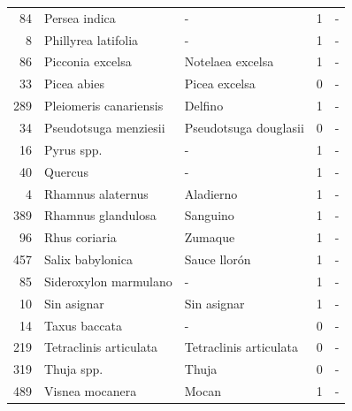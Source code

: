 \begin{longtable}{r p{4cm} p{5cm} c c}
    84            & Persea indica                     & -                                             & 1             & -              \\
    8             & Phillyrea latifolia               & -                                             & 1             & -              \\
    86            & Picconia excelsa                  & Notelaea excelsa                              & 1             & -              \\
    33            & Picea abies                       & Picea excelsa                                 & 0             & -              \\
    289           & Pleiomeris canariensis            & Delfino                                       & 1             & -              \\
    34            & Pseudotsuga menziesii             & Pseudotsuga douglasii                         & 0             & -              \\
    16            & Pyrus spp.                        & -                                             & 1             & -              \\
    40            & Quercus                           & -                                             & 1             & -              \\
    4             & Rhamnus alaternus                 & Aladierno                                     & 1             & -              \\
    389           & Rhamnus glandulosa                & Sanguino                                      & 1             & -              \\
    96            & Rhus coriaria                     & Zumaque                                       & 1             & -              \\
    457           & Salix babylonica                  & Sauce llorón                                  & 1             & -              \\
    85            & Sideroxylon marmulano             & -                                             & 1             & -              \\
    10            & Sin asignar                       & Sin asignar                                   & 1             & -              \\
    14            & Taxus baccata                     & -                                             & 0             & -              \\
    219           & Tetraclinis articulata            & Tetraclinis articulata                        & 0             & -              \\
    319           & Thuja spp.                        & Thuja                                         & 0             & -              \\
    489           & Visnea mocanera                   & Mocan                                         & 1             & -              \\
\end{longtable}


